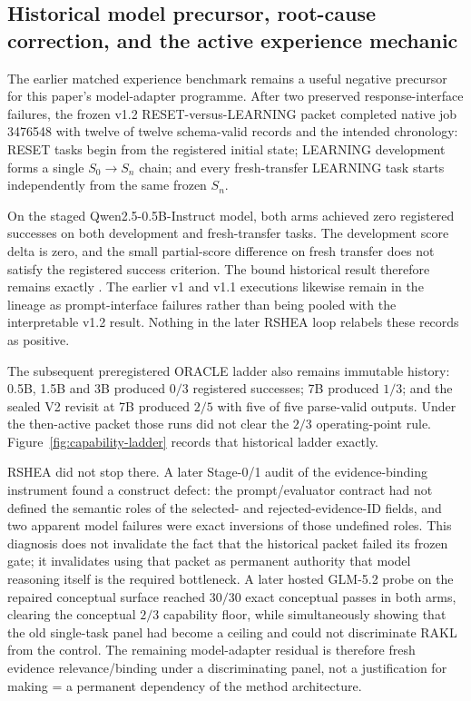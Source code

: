 \subsection{Historical model precursor, root-cause correction, and the active experience mechanic}

The earlier matched experience benchmark remains a useful negative precursor for this paper's model-adapter programme. After two preserved response-interface failures, the frozen v1.2 RESET-versus-LEARNING packet completed native job 3476548 with twelve of twelve schema-valid records and the intended chronology: RESET tasks begin from the registered initial state; LEARNING development forms a single $S_0\rightarrow S_n$ chain; and every fresh-transfer LEARNING task starts independently from the same frozen $S_n$.

On the staged Qwen2.5-0.5B-Instruct model, both arms achieved zero registered successes on both development and fresh-transfer tasks. The development score delta is zero, and the small partial-score difference on fresh transfer does not satisfy the registered success criterion. The bound historical result therefore remains exactly
.
The earlier v1 and v1.1 executions likewise remain in the lineage as prompt-interface failures rather than being pooled with the interpretable v1.2 result. Nothing in the later RSHEA loop relabels these records as positive.

The subsequent preregistered ORACLE ladder also remains immutable history: 0.5B, 1.5B and 3B produced $0/3$ registered successes; 7B produced $1/3$; and the sealed V2 revisit at 7B produced $2/5$ with five of five parse-valid outputs. Under the then-active packet those runs did not clear the $2/3$ operating-point rule. Figure~\ref{fig:capability-ladder} records that historical ladder exactly.

RSHEA did not stop there. A later Stage-0/1 audit of the evidence-binding instrument found a construct defect: the prompt/evaluator contract had not defined the semantic roles of the selected- and rejected-evidence-ID fields, and two apparent model failures were exact inversions of those undefined roles. This diagnosis does not invalidate the fact that the historical packet failed its frozen gate; it invalidates using that packet as permanent authority that model reasoning itself is the required bottleneck. A later hosted GLM-5.2 probe on the repaired conceptual surface reached $30/30$ exact conceptual passes in both arms, clearing the conceptual $2/3$ capability floor, while simultaneously showing that the old single-task panel had become a ceiling and could not discriminate RAKL from the control. The remaining model-adapter residual is therefore fresh evidence relevance/binding under a discriminating panel, not a justification for making = a permanent dependency of the method architecture.

